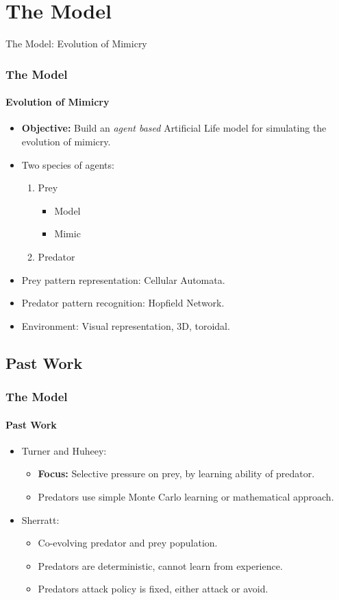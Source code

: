 \section{The Model}

\frame
{
	\begin{center}
		\LARGE The Model: Evolution of Mimicry
	\end{center}
}

\frame
{
	\frametitle{The Model}
	\framesubtitle{Evolution of Mimicry}
	
	\begin{itemize}
		\item \textbf{Objective:} Build an \textit{agent based} Artificial Life model for simulating the evolution of mimicry.	
		\item Two species of agents:
			\begin{enumerate}
				\item Prey
					\begin{itemize}
						\item Model
						\item Mimic
					\end{itemize}
				\item Predator
			\end{enumerate}
		\item Prey pattern representation: Cellular Automata.
		\item Predator pattern recognition: Hopfield Network.
		\item Environment: Visual representation, 3D, toroidal.
	\end{itemize}	
}

\subsection{Past Work}

\frame
{
	\frametitle{The Model}
	\framesubtitle{Past Work}

	\begin{itemize}
		\item Turner and Huheey:
			\begin{itemize}
				\item \textbf{Focus:} Selective pressure on prey, by learning ability of predator.
				\item Predators use simple Monte Carlo learning or mathematical approach.
			\end{itemize}
		\item Sherratt:
			\begin{itemize}
				\item Co-evolving predator and prey population.
				\item Predators are deterministic, cannot learn from experience.
				\item Predators attack policy is fixed, either attack or avoid.
			\end{itemize}
	\end{itemize}
}

